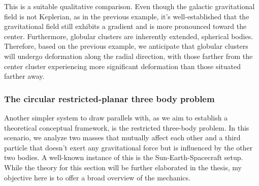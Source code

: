 This is a suitable qualitative comparison. Even though the galactic gravitational field is not Keplerian, as in the previous example, it's well-established that the gravitational field still exhibits a gradient and is more pronounced toward the center. Furthermore, globular clusters are inherently extended, spherical bodies. Therefore, based on the previous example, we anticipate that globular clusters will undergo deformation along the radial direction, with those farther from the center cluster experiencing more significant deformation than those situated farther away.


\subsubsection*{The circular restricted-planar three body problem}

Another simpler system to draw parallels with, as we aim to establish a theoretical conceptual framework, is the restricted three-body problem. In this scenario, we analyze two masses that mutually affect each other and a third particle that doesn't exert any gravitational force but is influenced by the other two bodies. A well-known instance of this is the Sun-Earth-Spacecraft setup. While the theory for this section will be further elaborated in the thesis, my objective here is to offer a broad overview of the mechanics.

